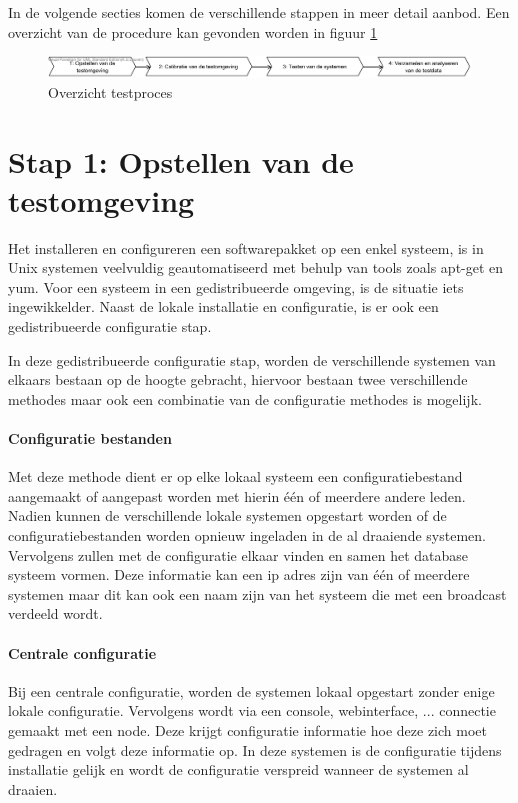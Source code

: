 In de volgende secties komen de verschillende stappen in meer detail aanbod.  Een overzicht van de procedure kan gevonden worden in figuur \ref{fig:test-process-overview}
\begin{figure}[h!]
\centering
\includegraphics[width=\linewidth]{img/Test-Process-Overview}
\caption{Overzicht testproces}
\label{fig:test-process-overview}
\end{figure}

\section{Stap 1: Opstellen van de testomgeving}
Het installeren en configureren een softwarepakket op een enkel systeem, is in Unix systemen veelvuldig geautomatiseerd met behulp van tools zoals \gls{apt-get} en \gls{yum}. Voor een systeem in een gedistribueerde omgeving, is de situatie iets ingewikkelder. Naast de lokale installatie en configuratie, is er ook een gedistribueerde configuratie stap.  

In deze gedistribueerde configuratie stap, worden de verschillende systemen van elkaars bestaan op de hoogte gebracht, hiervoor bestaan twee verschillende methodes maar ook een combinatie van de configuratie methodes is mogelijk.
 
\paragraph{Configuratie bestanden} Met deze methode dient er op elke lokaal systeem een configuratiebestand aangemaakt of aangepast worden met hierin één of meerdere andere leden. Nadien kunnen de verschillende lokale systemen opgestart worden of de configuratiebestanden worden opnieuw ingeladen in de al draaiende systemen. Vervolgens zullen met de configuratie elkaar vinden en samen het database systeem vormen. Deze informatie kan een ip adres zijn van één of meerdere systemen maar dit kan ook een naam zijn van het systeem die met een broadcast verdeeld wordt. 
\paragraph{Centrale configuratie} Bij een centrale configuratie, worden de systemen lokaal opgestart zonder enige lokale configuratie. Vervolgens wordt via een console, webinterface, ... connectie gemaakt met een node. Deze krijgt configuratie informatie hoe deze zich moet gedragen en volgt deze informatie op. In deze systemen is de configuratie tijdens installatie gelijk en wordt de configuratie verspreid wanneer de systemen al draaien.  


